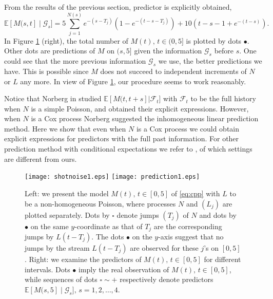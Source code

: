 \documentclass[11pt,leqno%
]{amsart}
\newcommand{\E }{{\mathbb E}}
\newcommand{\1}{{\mathbf 1}}
\begin{document}
From the results of the previous section, predictor is  
explicitly obtained,
\[
 \E [ M(s,t] \mid \mathcal G_s ] = 5 \sum_{j=1}^{N(s)}
 e^{-(s-T_j)}(1-e^{-(t-s-T_j)}) + 10(t-s-1+e^{-(t-s)}). 
\] 
In Figure \ref{fig:1} (right), the total number of $M(t),\,t\in(0,5]$ is plotted by
dots $\bullet$. Other dots are predictions of $M$ on $(s,5]$ given the
information $\mathcal G_s$ before $s$. One could see that the more
previous information $\mathcal G_s$ we use, the better predictions we
have. This is possible since $M$ does not succeed to independent increments
of $N$ or $L$ 
any more. In view of Figure \ref{fig:1}, our procedure seems to work
reasonably. 

Notice that Norberg in \cite{norberg:1999} studied $\E[M(t, t + s] | \mathcal F_t]$ with
$\mathcal F_t$ to be the full history when $N$ is a simple Poisson, and
obtained their explicit expressions. However, when $N$ is a Cox process 
Norberg %
suggested the inhomogeneous 
linear prediction method. Here we show that even when $N$ is a Cox
process we could obtain explicit expressions for predictors with the
full past information. For other prediction method 
with conditional expectations we refer to \cite{LBPJ:1999}, of which settings are different from ours. 
   

\begin{figure}
\begin{center}
\texttt{[image: shotnoise1.eps]}
\texttt{[image: prediction1.eps]}
\end{center}
\caption{Left: we present the model $M(t),\,t\in [0,5]$ of \eqref{eq:cpp} with  
$L$ to be a non-homogeneous Poisson, where processes $N$ and $(L_j)$ are plotted separately. Dots by
 $\square$ denote jumps $(T_j)$ of $N$ and dots by $\bullet$ on the same
 $y$-coordinate as that of $T_j$ are the corresponding jumps by $L(t-T_j)$. The dots
 $\bullet$ on the $y$-axis suggest that no jumps by the stream
 $L(t-T_j)$ are observed for these $j$'s on 
 $[0,5]$.  Right: we examine the predictors of $M(t),\,t\in [0,5]$ for
 different intervals. Dots $\bullet$ imply the real observation of
 $M(t),\,t\in [0,5]$, while sequences of dots $\square\sim +$
 respectively denote predictors $\E[M(s,5]\mid \mathcal
 G_s],\,s=1,2,\ldots,4$. 
}
\label{fig:1}
\end{figure}
\end{document}
